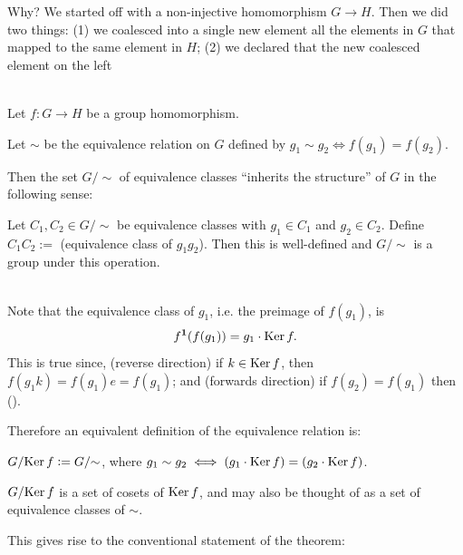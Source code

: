\begin{enumerate}
\begin{enumerate}
    Why? We started off with a non-injective homomorphism $G \to H$. Then we did two things: (1) we
    coalesced into a single new element all the elements in $G$ that mapped to the same element in
    $H$; (2) we declared that the new coalesced element on the left
  \end{enumerate}
\end{enumerate}

\newpage
\begin{theorem}~\\
  Let $f:G \to H$ be a group homomorphism.

  Let $\sim$ be the equivalence relation on $G$ defined by $g_1 \sim g_2 \iff f(g_1) = f(g_2)$.

  Then the set $G/{\sim}$ of equivalence classes ``inherits the structure'' of $G$ in the following
  sense:

  Let $C_1, C_2 \in G/{\sim}$ be equivalence classes with $g_1 \in C_1$ and $g_2 \in C_2$. Define
  $C_1C_2 := $ (equivalence class of $g_1g_2$). Then this is well-defined and $G/{\sim}$ is a group
  under this operation.

\end{theorem}

\begin{remark*}~\\
  Note that the equivalence class of $g_1$, i.e. the preimage of $f(g_1)$, is
  \begin{align*}
    f^{\mathbf 1}(f(g_1)) = g_1\cdot\operatorname{\mathrm{Ker}} f.
  \end{align*}
  This is true since, (reverse direction) if $k \in \operatorname{\mathrm{Ker}} f$, then $f(g_1k) = f(g_1)e = f(g_1)$; and
  (forwards direction) if $f(g_2) = f(g_1)$ then ().

  Therefore an equivalent definition of the equivalence relation is:

  $G/{\operatorname{\mathrm{Ker}} f} := G/{\sim}$, where $g_1 \sim g_2 \iff (g_1\cdot \operatorname{\mathrm{Ker}} f) = (g_2\cdot \operatorname{\mathrm{Ker}} f)$.

  $G/{\operatorname{\mathrm{Ker}} f}$ is a set of cosets of $\operatorname{\mathrm{Ker}} f$, and may also be thought of as a set of equivalence
  classes of $\sim$.

  This gives rise to the conventional statement of the theorem:
\end{remark*}

